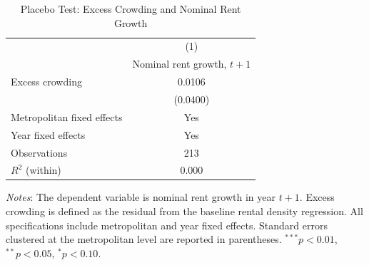 \begin{table}[!htbp]
\centering
\caption{Placebo Test: Excess Crowding and Nominal Rent Growth}
\label{tab:placebo_nominal_summary}
\begin{tabular}{l c}
\hline\hline
 & (1) \\
 & Nominal rent growth, $t+1$ \\
\hline
Excess crowding          & 0.0106 \\
                         & (0.0400) \\
\hline
Metropolitan fixed effects & Yes \\
Year fixed effects         & Yes \\
Observations               & 213 \\
$R^{2}$ (within)           & 0.000 \\
\hline\hline
\end{tabular}

\begin{flushleft}
\footnotesize
\textit{Notes}: The dependent variable is nominal rent growth in year $t+1$.
Excess crowding is defined as the residual from the baseline rental density regression.
All specifications include metropolitan and year fixed effects. Standard errors
clustered at the metropolitan level are reported in parentheses.
$^{***}p<0.01$, $^{**}p<0.05$, $^{*}p<0.10$.
\end{flushleft}
\end{table}
